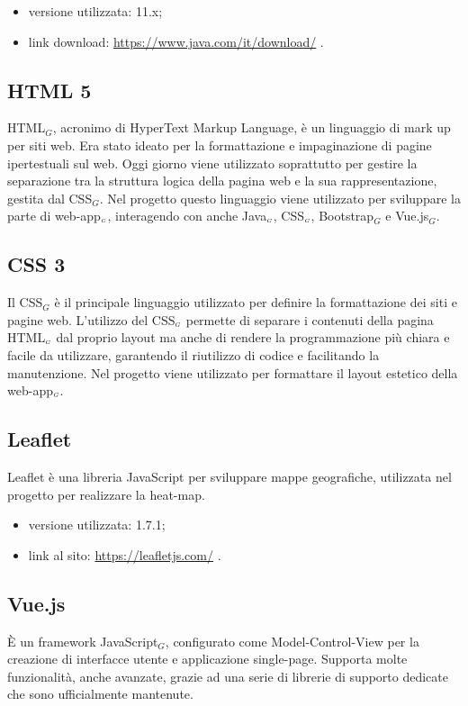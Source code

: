\begin{itemize}
	\item versione utilizzata: 11.x;
	\item link download: \url{https://www.java.com/it/download/} .
\end{itemize}

\subsection{HTML 5}\label{TecnologieHTML}
HTML$_G$, acronimo di HyperText Markup Language, è un linguaggio di mark up per siti web.
Era stato ideato per la formattazione e impaginazione di pagine ipertestuali sul web.
Oggi giorno viene utilizzato soprattutto per gestire la separazione tra la struttura logica della pagina web e la sua rappresentazione, gestita dal CSS$_G$.
Nel progetto questo linguaggio viene utilizzato per sviluppare la parte di web-app$_{\scaleto{G}{3pt}}$, interagendo con anche Java$_{\scaleto{G}{3pt}}$, CSS$_{\scaleto{G}{3pt}}$, Bootstrap$_G$ e Vue.js$_G$.


\subsection{CSS 3}\label{TecnologieCSS}
Il CSS$_G$ è il principale linguaggio utilizzato per definire la formattazione dei siti e pagine web.
L'utilizzo del CSS$_{\scaleto{G}{3pt}}$ permette di separare i contenuti della pagina HTML$_{\scaleto{G}{3pt}}$ dal proprio layout ma anche di rendere la programmazione più chiara e facile da utilizzare, garantendo il riutilizzo di codice e facilitando la manutenzione.
Nel progetto viene utilizzato per formattare il layout estetico della web-app$_{\scaleto{G}{3pt}}$.

\subsection{Leaflet} \label{TecnologieLeaflet}
Leaflet è una libreria JavaScript per sviluppare mappe geografiche, utilizzata nel progetto per realizzare la heat-map.
\begin{itemize}
	\item versione utilizzata: 1.7.1;
	\item link al sito: \url{https://leafletjs.com/} .
\end{itemize}


\subsection{Vue.js}\label{TecnologieVue}
È un framework JavaScript$_G$, configurato come Model-Control-View per la creazione di interfacce utente e applicazione single-page.
Supporta molte funzionalità, anche avanzate, grazie ad una serie di librerie di supporto dedicate che sono ufficialmente mantenute.

